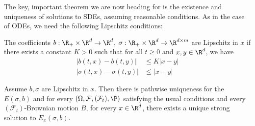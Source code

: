 \documentclass[a4paper]{article}
\begin{document}
The key, important theorem we are now heading for is the existence and uniqueness of solutions to SDEs, assuming reasonable conditions. As in the case of ODEs, we need the following Lipschitz conditions:

\begin{defi}
  The coefficients $b: \R_+ \times \R^d \to \R^d$, $\sigma: \R_+ \times \R^d \to \R^{d \times m}$ are Lipschitz in $x$ if there exists a constant $K > 0$ such that for all $t \geq 0$ and $x, y \in \R^d$, we have
  \begin{align*}
    |b(t, x) - b(t, y)| &\leq K|x - y|\\
    |\sigma(t, x) - \sigma(t, y)| &\leq |x - y|
  \end{align*}
\end{defi}

\begin{thm}
  Assume $b, \sigma$ are Lipschitz in $x$. Then there is pathwise uniqueness for the $E(\sigma, b)$ and for every $(\Omega, \mathcal{F}, (\mathcal{F}_t), \P)$ satisfying the usual conditions and every $(\mathcal{F}_t)$-Brownian motion $B$, for every $x \in \R^d$, there exists a unique strong solution to $E_x(\sigma, b)$.
\end{thm}
\end{document}
